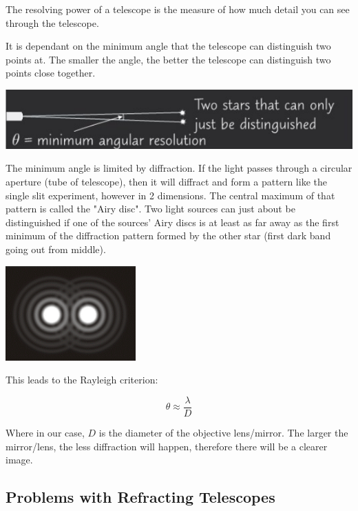 \documentclass[a4paper, 12pt]{article}
\begin{document}
The resolving power of a telescope is the measure of how much detail you can see through the telescope.

It is dependant on the minimum angle that the telescope can distinguish two points at. The smaller the angle, the better the telescope can distinguish two points close together.

\includegraphics[width=\textwidth]{images/angularResolution.png}

The minimum angle is limited by diffraction. If the light passes through a circular aperture (tube of telescope), then it will diffract and form a pattern like the single slit experiment, however in 2 dimensions. The central maximum of that pattern is called the "Airy disc". Two light sources can just about be distinguished if one of the sources' Airy discs is at least as far away as the first minimum of the diffraction pattern formed by the other star (first dark band going out from middle).

\begin{center}
\includegraphics[width=5cm]{images/airyDisc.png}
\end{center}

This leads to the Rayleigh criterion:

$$
\theta \approx \frac{\lambda}{D}
$$

Where in our case, $D$ is the diameter of the objective lens/mirror. The larger the mirror/lens, the less diffraction will happen, therefore there will be a clearer image.

\subsection{Problems with Refracting Telescopes}
\end{document}
